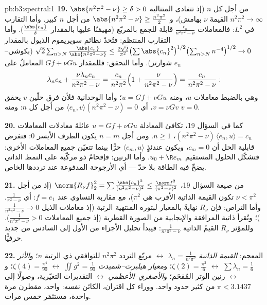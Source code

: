 \begin{solution}{pb:b3:spectral:1}
\textbf{19.} $\abs{n^2\pi^2 - \nu} \geq \delta > 0$ من أجل كل $n$ (إذ تتفادى المتتالية $n^2\pi^2 \to \infty$
القيمةَ $\nu$ بهامش)، و $\abs{n^2\pi^2 - \nu} \geq \frac{n^2\pi^2}2$ من أجل $n$ كبير. وأما التقارب
في $L^2$: فالمعاملات $\frac{c_n}{n^2\pi^2 - \nu}$ قابلة للجمع بالمربّع (مهيمَنًا
عليها بالمقدار $\frac{\abs{c_n}}\delta$). وأما التقارب المنتظم: فتُحدّ نظائم
سوپريموم الذيول بالمقدار $\sqrt2\sum_{n>N}
\frac{\abs{c_n}}{\abs{n^2\pi^2 - \nu}} \leq
\frac{2\sqrt2}{\pi^2}\bigl(\sum\abs{c_n}^2\bigr)^{1/2}
\bigl(\sum_{n>N}n^{-4}\bigr)^{1/2} \to 0$ (بكوشي--شوارتز). وأما التحقق:
فللمقدار $Gf + \nu Gu$ المعاملُ على $e_n$
\[
\lambda_nc_n + \frac{\nu\lambda_nc_n}{n^2\pi^2 - \nu}
= \frac{c_n}{n^2\pi^2}\Bigl(1 + \frac{\nu}{n^2\pi^2 -
\nu}\Bigr) = \frac{c_n}{n^2\pi^2 - \nu} :
\]
وهي بالضبط معاملات $u$، ومنه $u = Gf + \nu Gu$؛ وأما الوحدانية فلأن فرق
حلّين $v$ يحقق $v = \nu
Gv$، أي $\langle e_n, v\rangle(n^2\pi^2 - \nu) = 0$ من أجل كل $n$: ومنه $v = 0$.

\textbf{20.} كما في السؤال 19، تكافئ المعادلة $u = Gf + \nu
Gu$ عائلةَ
معادلات المعاملات $(n^2\pi^2 - \nu)\,\langle e_n, u\rangle = c_n$، $n \geq
1$. ومن أجل $n = m$ يكون الطرف
الأيسر $0$: فتفرض قابلية الحل أن $c_m = 0$، ويكون عندئذٍ $\langle e_m,
u\rangle$
حرًّا بينما تتعيّن جميع المعاملات الأخرى: فتشكّل الحلول المستقيم
$u_0 + \R e_m$. وأما الرنين: فإقحامٌ ذو مركّبة على النمط الذاتي
يضخّ فيه الطاقة بلا حدّ --- أي الأرجوحة المدفوعة عند ترددها
الخاص.

\textbf{21.} من صيغة السؤال 19، $\norm{R_\nu f}_2^2
= \sum\frac{\abs{c_n}^2}{(n^2\pi^2 - \nu)^2} \leq
\frac{\norm f^2}{(\pi^2 - \nu)^2}$ (إذ من أجل $\nu < \pi^2$
تكون القيمة الذاتية الأقرب هي $\pi^2$)، مع مقاربة التساوي عند
$f = e_1$: أي  $\frac1{\pi^2 - \nu}$. وأما التراص: فإن $R_\nu$
نهايةٌ بالمعيار لبتوره المنتهية الرتبة (إذ معاملات الذيل $\frac1{n^2\pi^2 - \nu} \to 0$)؛
وتُقرأ ذاتية المرافقة والإيجابية من الصورة القطرية (إذ جميع
المعاملات $\frac1{n^2\pi^2 - \nu} > 0$). وللمؤثر $R_\nu$ القيمُ الذاتية $\frac1{n^2\pi^2 - \nu}$:
فيبدأ تحليل الأجزاء من الأول إلى السادس من جديد حرفيًّا.

\textbf{22.} المعجم: \emph{القيمة الذاتية} $\lambda_n =
\frac1{n^2\pi^2}$ $\leftrightarrow$ مربّع
التردد $n^2\pi^2$ للتوافقي ذي الرتبة $n$؛ و\emph{الأثر} $\sum
\lambda_n = \frac16$
$\leftrightarrow$ $\zeta(2) =
\frac{\pi^2}6$؛ و\emph{معيار هيلبرت--شميدت} $\iint g^2 =
\frac1{90}$ $\leftrightarrow$
$\zeta(4) = \frac{\pi^4}{90}$؛ و\emph{} $\leftrightarrow$ رنين الوتر المُقحَم؛
و\emph{الأصغري--الأعظمي} $\leftrightarrow$ التقديرات التغيّرية، وصولًا
إلى $\pi < 3.1437$ من كثير حدود واحد. ووراء كل اقتران، الكائن
نفسه:   واحد، مقطرن مرة واحدة، مستثمَر
خمس مرات.


\end{solution}
